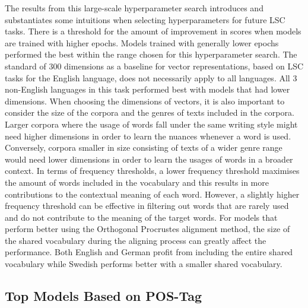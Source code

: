 The results from this large-scale hyperparameter search introduces and substantiates some intuitions when selecting hyperparameters for future LSC tasks. There is a threshold for the amount of improvement in scores when models are trained with higher epochs. Models trained with generally lower epochs performed the best within the range chosen for this hyperparameter search. The standard of 300 dimensions as a baseline for vector representations, based on LSC tasks for the English language, does not necessarily apply to all languages. All 3 non-English languages in this task performed best with models that had lower dimensions. When choosing the dimensions of vectors, it is also important to consider the size of the corpora and the genres of texts included in the corpora. Larger corpora where the usage of words fall under the same writing style might need higher dimensions in order to learn the nuances whenever a word is used. Conversely, corpora smaller in size consisting of texts of a wider genre range would need lower dimensions in order to learn the usages of words in a broader context. In terms of frequency thresholds, a lower frequency threshold maximises the amount of words included in the vocabulary and this results in more contributions to the contextual meaning of each word. However, a slightly higher frequency threshold can be effective in filtering out words that are rarely used and do not contribute to the meaning of the target words. For models that perform better using the Orthogonal Procrustes alignment method, the size of the shared vocabulary during the aligning process can greatly affect the performance. Both English and German profit from including the entire shared vocabulary while Swedish performs better with a smaller shared vocabulary.

\subsection{Top Models Based on POS-Tag}

